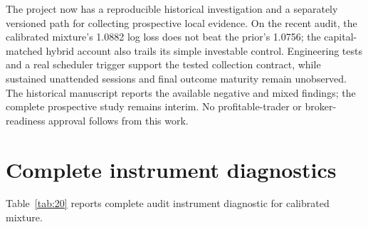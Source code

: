 \documentclass[11pt,a4paper]{article}
\begin{document}
The project now has a reproducible historical investigation and a separately versioned path for collecting prospective local evidence. On the recent audit, the calibrated mixture's 1.0882 log loss does not beat the prior's 1.0756; the capital-matched hybrid account also trails its simple investable control. Engineering tests and a real scheduler trigger support the tested collection contract, while sustained unattended sessions and final outcome maturity remain unobserved. The historical manuscript reports the available negative and mixed findings; the complete prospective study remains interim. No profitable-trader or broker-readiness approval follows from this work.


\clearpage{}


\clearpage\appendix
\section{Complete instrument diagnostics}\label{sec:appendix-a}

\noindent Table~\ref{tab:20} reports complete audit instrument diagnostic for calibrated mixture.
\end{document}
